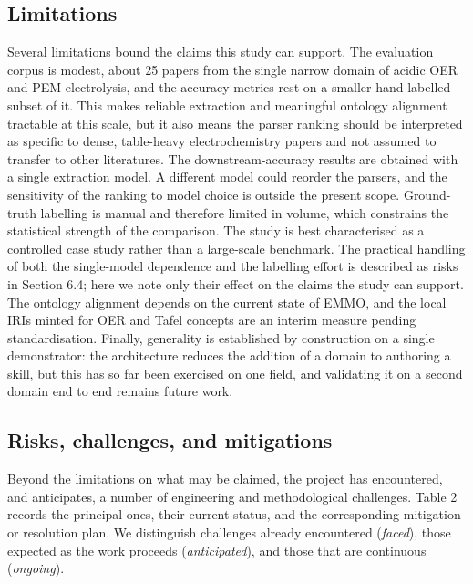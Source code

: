 \documentclass{template}
\begin{document}
\subsection{Limitations}

Several limitations bound the claims this study can support. The evaluation corpus is modest, about 25 papers from the single narrow domain of acidic OER and PEM electrolysis, and the accuracy metrics rest on a smaller hand-labelled subset of it. This makes reliable extraction and meaningful ontology alignment tractable at this scale, but it also means the parser ranking should be interpreted as specific to dense, table-heavy electrochemistry papers and not assumed to transfer to other literatures. The downstream-accuracy results are obtained with a single extraction model. A different model could reorder the parsers, and the sensitivity of the ranking to model choice is outside the present scope. Ground-truth labelling is manual and therefore limited in volume, which constrains the statistical strength of the comparison. The study is best characterised as a controlled case study rather than a large-scale benchmark. The practical handling of both the single-model dependence and the labelling effort is described as risks in Section 6.4; here we note only their effect on the claims the study can support. The ontology alignment depends on the current state of EMMO, and the local IRIs minted for OER and Tafel concepts are an interim measure pending standardisation. Finally, generality is established by construction on a single demonstrator: the architecture reduces the addition of a domain to authoring a skill, but this has so far been exercised on one field, and validating it on a second domain end to end remains future work.

\subsection{Risks, challenges, and mitigations}

Beyond the limitations on what may be claimed, the project has encountered, and anticipates, a number of engineering and methodological challenges. Table 2 records the principal ones, their current status, and the corresponding mitigation or resolution plan. We distinguish challenges already encountered (\textit{faced}), those expected as the work proceeds (\textit{anticipated}), and those that are continuous (\textit{ongoing}).
\end{document}

